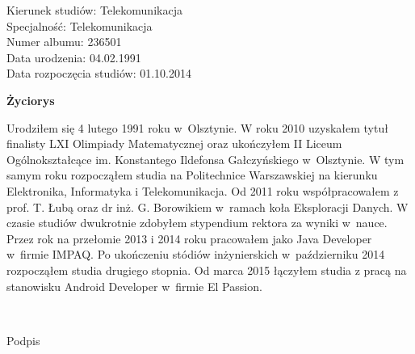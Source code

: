 	\newpage
	\thispagestyle{empty}

\begin{flushright}

  \begin{varwidth}[t]{\textwidth}
	Kierunek studiów: Telekomunikacja\\
	Specjalność: Telekomunikacja \\
	Numer albumu: 236501\\
	Data urodzenia: 04.02.1991 \\
	Data rozpoczęcia studiów: 01.10.2014 \\
  \end{varwidth}

\end{flushright}

\begin{center}
    \textbf{\textbf{Życiorys}}
\end{center}

	\vspace{0.5cm}

Urodziłem się 4 lutego 1991 roku w~Olsztynie.
W roku 2010 uzyskałem tytuł finalisty LXI Olimpiady Matematycznej oraz
ukończyłem II Liceum Ogólnokształcące im. Konstantego Ildefonsa Gałczyńskiego w~Olsztynie.
W tym samym roku rozpocząłem studia na Politechnice Warszawskiej na kierunku Elektronika, Informatyka i Telekomunikacja.
Od 2011 roku współpracowałem z prof. T. Łubą oraz dr inż. G. Borowikiem w~ramach koła Eksploracji Danych.
W czasie studiów dwukrotnie zdobyłem stypendium rektora za wyniki w~nauce.
Przez rok na przełomie 2013 i 2014 roku pracowałem jako Java Developer w~firmie IMPAQ.
Po ukończeniu stódiów inżynierskich w~październiku 2014 rozpocząłem studia drugiego stopnia.
Od marca 2015 łączyłem studia z pracą na stanowisku Android Developer w~firmie El Passion.

	\vspace{1cm}

\begin{flushright}
	\begin{minipage}{5cm}
		\dotfill \\[-0.7cm]
		\begin{center}
		\small Podpis
		\end{center}
	\end{minipage}
\end{flushright}

	\vspace{2cm}
